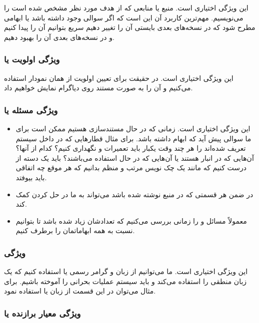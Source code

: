 این ویژگی اختیاری است. منبع یا منابعی که از هدف مورد نظر مشخص شده است را
می‌نویسیم. مهم‌ترین کاربرد آن این است که اگر سوالی وجود داشته باشد یا ابهامی
مطرح شود که در نسخه‌های بعدی بایستی آن را تغییر دهیم سریع بتوانیم آن را پیدا
کنیم و در نسخه‌های بعدی آن را بهبود دهیم.

\subsubsection{ویژگی اولویت یا }

این ویژگی اختیاری است. در حقیقت برای تعیین اولویت از همان نمودار 
استفاده می‌کنیم و آن را به صورت مستند روی دیاگرام نمایش خواهیم داد.

\subsubsection{ویژگی مسئله یا }

\begin{itemize}
    \item این ویژگی اختیاری است. زمانی که در حال مستندسازی هستیم ممکن است برای
    ما سوالی پیش آید که ابهام داشته باشد. برای مثال قطار‌هایی که در داخل سیستم
    تعریف شده‌اند را هر چند وقت یکبار باید تعمیرات و نگهداری کنیم؟ کدام از آنها؟
    آن‌هایی که در انبار هستند یا آن‌هایی که در حال استفاده می‌باشند؟ باید یک
    دسته از  درست کنیم که مانند یک چک نویس مرتب و منظم بدانیم که هر
    موقع چه اتفاقی باید بیوفتد.
    \item در ضمن هر قسمتی که در منبع نوشته شده باشد می‌تواند به ما در حل کردن
     کمک کند.
    \item معمولاً مسائل و  را زمانی بررسی می‌کنیم که تعدادشان زیاد شده
    باشد تا بتوانیم نسبت به همه ابهاماتمان را برطرف کنیم.
\end{itemize}

\subsubsection{ویژگی }

این ویژگی اختیاری است. ما می‌توانیم از زبان و گرامر رسمی یا  استفاده
کنیم که یک زبان منطقی را استفاده می‌کند و باید سیستم عملیات بحرانی را آموخته
باشیم. برای مثال می‌توان در این قسمت از زبان  یا  استفاده نمود.

\subsubsection{ویژگی معیار برازنده یا }

